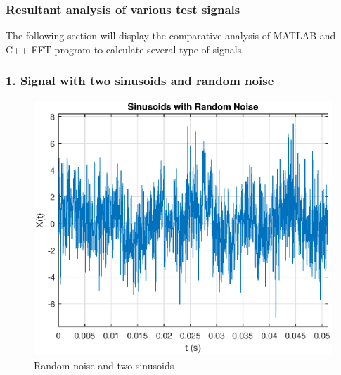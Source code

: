\begin{refsection}


\subsubsection{Resultant analysis of various test signals}

The following section will display the comparative analysis of MATLAB and C++ FFT program to calculate several type of signals.

\subsubsection{1. Signal with two sinusoids and random noise}

\begin{figure}[h]
	\centering
	\includegraphics[width=12cm]{./algorithms/fft/figures/random_noise.eps}
	\caption{Random noise and two sinusoids}\label{random_noise}
\end{figure}


\end{refsection}
